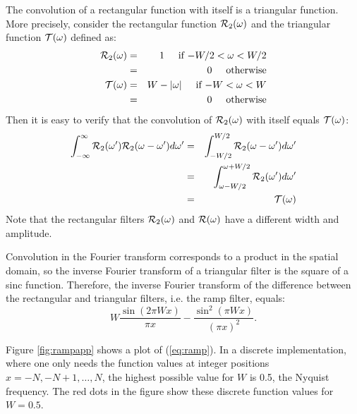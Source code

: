 The convolution of a rectangular function with itself is a triangular
function. More precisely, consider the rectangular function 
${\cal R}_2(\omega)$ and the triangular function ${\cal T}(\omega)$
defined as:
\begin{eqnarray}
 {\cal R}_2(\omega) &=& 1 \hspace{5mm} \mbox{if   $-W/2 < \omega < W/2$}
                        \nonumber \\
                    &=& 0  \hspace{5mm} \mbox{otherwise}\\
 {\cal T}(\omega) &=& W - |\omega| \hspace{5mm} 
             \mbox{if   $-W < \omega < W$} \nonumber\\
                  &=& 0  \hspace{5mm} \mbox{otherwise}
\end{eqnarray}
Then it is easy to verify that the convolution of ${\cal R}_2(\omega)$
with itself equals ${\cal T}(\omega)$:
\begin{eqnarray}
    \int_{-\infty}^\infty {\cal R}_2(\omega') 
                          {\cal R}_2(\omega - \omega') d\omega'
&=& \int_{-W/2}^{W/2} {\cal R}_2(\omega - \omega') d\omega' \nonumber\\
&=& \int_{\omega-W/2}^{\omega+W/2} {\cal R}_2(\omega') d\omega' \nonumber\\
&=& {\cal T}(\omega) 
\end{eqnarray}
Note that the rectangular filters ${\cal R}_2(\omega)$ and ${\cal
R}(\omega)$ have a different width and amplitude.

Convolution in the Fourier transform corresponds to a product in the
spatial domain, so the inverse Fourier transform of a triangular
filter is the square of a sinc function. Therefore, the inverse
Fourier transform of the difference between the rectangular and
triangular filters, i.e. the ramp filter, equals:
\begin{equation}
  W \frac{\sin(2 \pi W x)}{\pi x} - \frac{\sin^2(\pi W x)}{(\pi x)^2}.
  \label{eq:ramp}
\end{equation}

Figure \ref{fig:rampapp} shows a plot of (\ref{eq:ramp}). In a
discrete implementation, where one only needs the function values at
integer positions $x = -N, -N+1, \ldots,N$, the highest possible value
for $W$ is 0.5, the Nyquist frequency. The red dots in the figure show
these discrete function values for $W = 0.5$. 

